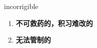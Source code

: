 
\begin{frame}
{\huge incorrigible}
\begin{center}
\begin{enumerate}\Large
  \item \textbf{不可救药的，积习难改的}
  \item \textbf{无法管制的}
\end{enumerate}
\end{center}
\end{frame}

